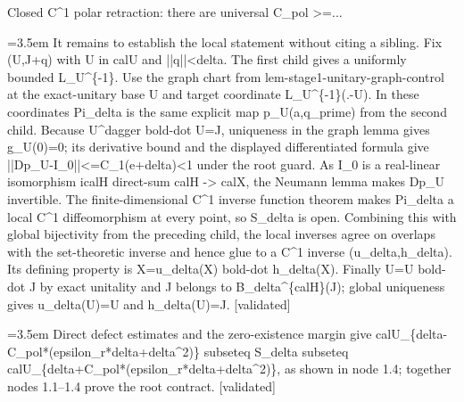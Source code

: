 \documentclass{article}
\newcommand{\step}[1]{\par\noindent\hangindent=3.5em\hangafter=1%
  \makebox[3.5em][l]{\textbf{#1.}}}
\newcommand{\steptag}[1]{\hfill{\small\textsf{[#1]}}}
\begin{document}
\begin{proofbox}{Closed C\textasciicircum{}1 polar retraction: there are universal C\_pol >=...}
\step{1.3.2.4} It remains to establish the local statement without citing a sibling. Fix (U,J+q) with U in calU and ||q||<delta. The first child gives a uniformly bounded L\_U\textasciicircum{}\{-1\}. Use the graph chart from lem-stage1-unitary-graph-control at the exact-unitary base U and target coordinate L\_U\textasciicircum{}\{-1\}(.-U). In these coordinates Pi\_delta is the same explicit map p\_U(a,q\_prime) from the second child. Because U\textasciicircum{}dagger bold-dot U=J, uniqueness in the graph lemma gives g\_U(0)=0; its derivative bound and the displayed differentiated formula give ||Dp\_U-I\_0||<=C\_1(e+delta)<1 under the root guard. As I\_0 is a real-linear isomorphism icalH direct-sum calH -> calX, the Neumann lemma makes Dp\_U invertible. The finite-dimensional C\textasciicircum{}1 inverse function theorem makes Pi\_delta a local C\textasciicircum{}1 diffeomorphism at every point, so S\_delta is open. Combining this with global bijectivity from the preceding child, the local inverses agree on overlaps with the set-theoretic inverse and hence glue to a C\textasciicircum{}1 inverse (u\_delta,h\_delta). Its defining property is X=u\_delta(X) bold-dot h\_delta(X). Finally U=U bold-dot J by exact unitality and J belongs to B\_delta\textasciicircum{}\{calH\}(J); global uniqueness gives u\_delta(U)=U and h\_delta(U)=J. \steptag{validated} \\[4pt]
\step{1.4} Direct defect estimates and the zero-existence margin give calU\_\{delta-C\_pol*(epsilon\_r*delta+delta\textasciicircum{}2)\} subseteq S\_delta subseteq calU\_\{delta+C\_pol*(epsilon\_r*delta+delta\textasciicircum{}2)\}, as shown in node 1.4; together nodes 1.1--1.4 prove the root contract. \steptag{validated} \\[6pt]

\end{proofbox}
\end{document}
